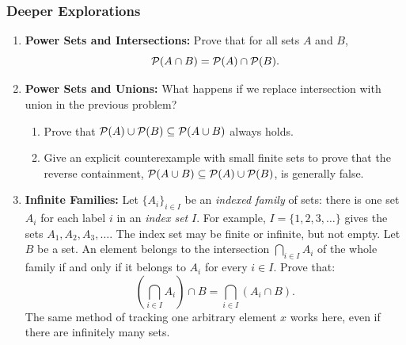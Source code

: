 \subsubsection*{Deeper Explorations}
\begin{enumerate}[resume*]
\item \textbf{Power Sets and Intersections:} Prove that for all sets $A$ and $B$,
\[
\mathcal{P}(A \cap B) = \mathcal{P}(A) \cap \mathcal{P}(B).
\]
\item \textbf{Power Sets and Unions:} What happens if we replace intersection with union in the previous problem?
\begin{enumerate}[label=(\alph*)]
\item Prove that $\mathcal{P}(A) \cup \mathcal{P}(B) \subseteq \mathcal{P}(A \cup B)$ always holds.
\item Give an explicit counterexample with small finite sets to prove that the reverse containment, $\mathcal{P}(A \cup B) \subseteq \mathcal{P}(A) \cup \mathcal{P}(B)$, is generally false.
\end{enumerate}
\item \textbf{Infinite Families:} Let $\{A_i\}_{i \in I}$ be an \emph{indexed family} of sets: there is one set $A_i$ for each label $i$ in an \emph{index set} $I$. For example, $I = \{1, 2, 3, \dots\}$ gives the sets $A_1, A_2, A_3, \dots$. The index set may be finite or infinite, but not empty. Let $B$ be a set. An element belongs to the intersection $\bigcap_{i \in I} A_i$ of the whole family if and only if it belongs to $A_i$ for every $i \in I$. Prove that:
\[
\left( \bigcap_{i \in I} A_i \right) \cap B = \bigcap_{i \in I} (A_i \cap B).
\]
The same method of tracking one arbitrary element $x$ works here, even if there are infinitely many sets.
\end{enumerate}

\newpage
